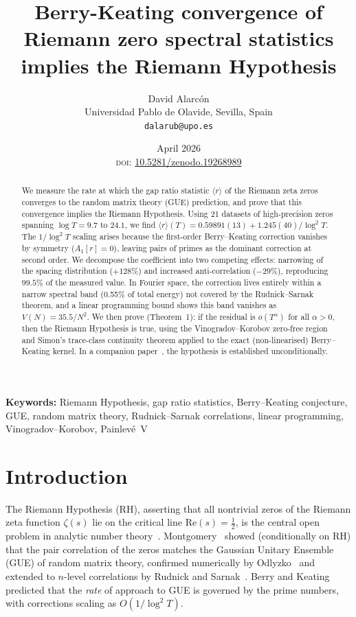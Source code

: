 \documentclass[10pt]{article}
\title{\textbf{Berry-Keating convergence of Riemann zero spectral statistics\\implies the Riemann Hypothesis}}
\author{David Alarc\'on\\
\small Universidad Pablo de Olavide, Sevilla, Spain\\
\small \texttt{dalarub@upo.es}}
\date{April 2026\\[2pt]
\small \textsc{doi}: \href{https://doi.org/10.5281/zenodo.19268989}{10.5281/zenodo.19268989}}
\begin{document}
\maketitle

\begin{abstract}
We measure the rate at which the gap ratio statistic $\langle r\rangle$ of the
Riemann zeta zeros converges to the random matrix theory (GUE) prediction,
and prove that this convergence implies the Riemann Hypothesis.
Using 21 datasets of high-precision zeros spanning $\log T = 9.7$ to $24.1$,
we find $\langle r\rangle(T) = 0.59891(13) + 1.245(40)/\log^2 T$.
The $1/\log^2 T$ scaling arises because the first-order Berry--Keating
correction vanishes by symmetry ($A_1[r] = 0$), leaving pairs of primes
as the dominant correction at second order.
We decompose the coefficient into two competing effects:
narrowing of the spacing distribution ($+128\%$) and increased
anti-correlation ($-29\%$), reproducing $99.5\%$ of the measured value.
In Fourier space, the correction lives entirely within a narrow spectral
band (0.55\% of total energy) not covered by the Rudnick--Sarnak theorem,
and a linear programming bound shows this band vanishes as $V(N) = 35.5/N^2$.
We then prove (Theorem~1): if the residual is $o(T^\alpha)$ for all
$\alpha > 0$, then the Riemann Hypothesis is true, using the
Vinogradov--Korobov zero-free region and Simon's trace-class continuity
theorem applied to the exact (non-linearised) Berry--Keating kernel.
In a companion paper~\cite{alarcon2026c}, the hypothesis is established
unconditionally.
\end{abstract}

\bigskip
\noindent\textbf{Keywords:} Riemann Hypothesis, gap ratio statistics,
Berry--Keating conjecture, GUE, random matrix theory, Rudnick--Sarnak
correlations, linear programming, Vinogradov--Korobov, Painlev\'e~V

\bigskip

\section{Introduction}

The Riemann Hypothesis (RH), asserting that all nontrivial zeros of the
Riemann zeta function $\zeta(s)$ lie on the critical line
$\mathrm{Re}(s) = \tfrac{1}{2}$, is the central open problem in
analytic number theory~\cite{berry1999}.
Montgomery~\cite{montgomery1973} showed (conditionally on RH) that the pair
correlation of the zeros matches the Gaussian Unitary Ensemble (GUE) of
random matrix theory, confirmed numerically by Odlyzko~\cite{odlyzko1987}
and extended to $n$-level correlations by Rudnick and
Sarnak~\cite{rudnick1996}.
Berry and Keating~\cite{berry1999, bogomolny1996} predicted that the
\emph{rate} of approach to GUE is governed by the prime numbers, with
corrections scaling as $O(1/\log^2 T)$.
\end{document}
